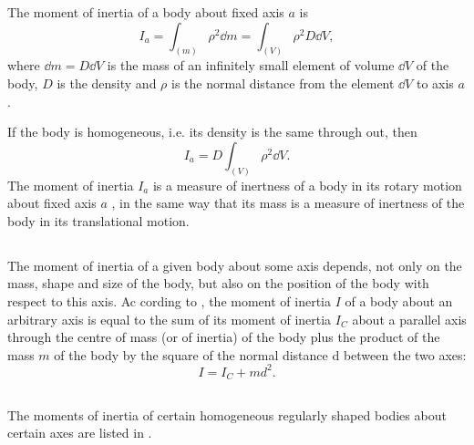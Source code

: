 The moment of inertia of a body about fixed axis $a$ is
\begin{equation*}%
I_{a} =  \int_{(m)} \rho^{2} \dd m = \int_{(V)} \rho^{2} D \dd V,
\end{equation*}
where $\dd m = D \dd V$ is the mass of an infinitely small element of volume $\dd V$ of the body, $D$ is the density and $\rho$ is the normal distance from the element $\dd V$ to axis $a$.

If the body is homogeneous, i.e. its density is the same through­ out, then
\begin{equation*}%
I_{a} =  D \int_{(V)} \rho^{2} \dd V.
\end{equation*}
The moment of inertia $I_{a}$ is a measure of inertness of a body in its rotary motion about fixed axis $a$ , in the same way that its mass is a measure of inertness of the body in its transla­tional motion.

\subsection{}\label{4.2.2} The moment of inertia of a given body about some axis depends, not only on the mass, shape and size of the body, but also on the position of the body with respect to this axis. Ac­ cording to , the moment of inertia $I$ of a body about an arbitrary axis is equal to the sum of its moment of inertia $I_{C}$ about a parallel axis through the centre of mass (or of inertia) of the body plus the product of the mass $m$ of the body by the square of the normal distance d between the two axes:
\begin{equation*}%
I = I_{C} + md^{2}.
\end{equation*}

\clearpage
\subsection{}\label{4.2.3} The moments of inertia of certain homogeneous regularly shaped bodies about certain axes are listed in .

